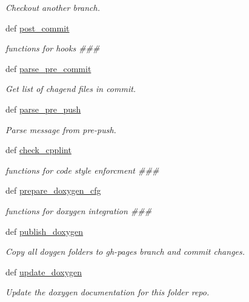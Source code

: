 \begin{DoxyCompactItemize}
\begin{DoxyCompactList}\small\item\em Checkout another branch. \end{DoxyCompactList}\item 
def \hyperlink{classgithookcontroller_1_1GitHookController_aafe2c7cbed97963e0295cfbae0136058}{post\-\_\-commit}
\begin{DoxyCompactList}\small\item\em functions for hooks \#\#\# \end{DoxyCompactList}\item 
def \hyperlink{classgithookcontroller_1_1GitHookController_a99438b6d511dfb4a3d98624318f2b8dd}{parse\-\_\-pre\-\_\-commit}
\begin{DoxyCompactList}\small\item\em Get list of chagend files in commit. \end{DoxyCompactList}\item 
def \hyperlink{classgithookcontroller_1_1GitHookController_afc24ced7e8d3a9a5a605b0de22e949a8}{parse\-\_\-pre\-\_\-push}
\begin{DoxyCompactList}\small\item\em Parse message from pre-\/push. \end{DoxyCompactList}\item 
def \hyperlink{classgithookcontroller_1_1GitHookController_a67a1f8d4dd8d4941c4b7409d972c7766}{check\-\_\-cpplint}
\begin{DoxyCompactList}\small\item\em functions for code style enforcment \#\#\# \end{DoxyCompactList}\item 
def \hyperlink{classgithookcontroller_1_1GitHookController_afa6bd69c6d0a9e9654cec6e3aeab34a8}{prepare\-\_\-doxygen\-\_\-cfg}
\begin{DoxyCompactList}\small\item\em functions for doxygen integration \#\#\# \end{DoxyCompactList}\item 
def \hyperlink{classgithookcontroller_1_1GitHookController_abd2d8e22fd8772e5c586748a0605cbe3}{publish\-\_\-doxygen}
\begin{DoxyCompactList}\small\item\em Copy all doygen folders to gh-\/pages branch and commit changes. \end{DoxyCompactList}\item 
def \hyperlink{classgithookcontroller_1_1GitHookController_a256c5c260e76ab6da328a334af64e13e}{update\-\_\-doxygen}
\begin{DoxyCompactList}\small\item\em Update the doxygen documentation for this folder repo. \end{DoxyCompactList}\end{DoxyCompactItemize}
